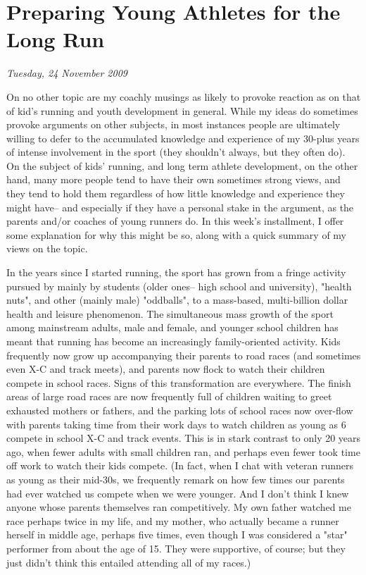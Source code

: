\chapter{Preparing Young Athletes for the Long Run}
\textit{Tuesday, 24 November 2009}
\bigskip

On no other topic are my coachly musings as likely to provoke reaction as on that of kid's running and youth development in general. While my ideas do sometimes provoke arguments on other subjects, in most instances people are ultimately willing to defer to the accumulated knowledge and experience of my 30-plus years of intense involvement in the sport (they shouldn't always, but they often do). On the subject of kids' running, and long term athlete development, on the other hand, many more people tend to have their own sometimes strong views, and they tend to hold them regardless of how little knowledge and experience they might have-- and especially if they have a personal stake in the argument, as the parents and/or coaches of young runners do. In this week's installment, I offer some explanation for why this might be so, along with a quick summary of my views on the topic.

In the years since I started running, the sport has grown from a fringe activity pursued by mainly by students (older ones-- high school and university), "health nuts", and other (mainly male) "oddballs", to a mass-based, multi-billion dollar health and leisure phenomenon. The simultaneous mass growth of the sport among mainstream adults, male and female, and younger school children has meant that running has become an increasingly family-oriented activity. Kids frequently now grow up accompanying their parents to road races (and sometimes even X-C and track meets), and parents now flock to watch their children compete in school races. Signs of this transformation are everywhere. The finish areas of large road races are now frequently full of children waiting to greet exhausted mothers or fathers, and the parking lots of school races now over-flow with parents taking time from their work days to watch children as young as 6 compete in school X-C and track events. This is in stark contrast to only 20 years ago, when fewer adults with small children ran, and perhaps even fewer took time off work to watch their kids compete. (In fact, when I chat with veteran runners as young as their mid-30s, we frequently remark on how few times our parents had ever watched us compete when we were younger. And I don't think I knew anyone whose parents themselves ran competitively. My own father watched me race perhaps twice in my life, and my mother, who actually became a runner herself in middle age, perhaps five times, even though I was considered a "star" performer from about the age of 15. They were supportive, of course; but they just didn't think this entailed attending all of my races.)

